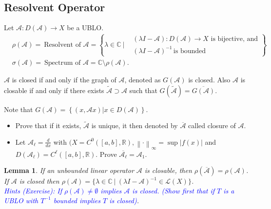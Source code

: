 \documentclass[12pt, oneside]{book}
\newtheorem{lemma}{Lemma}[section]
\newcommand{\norm}[1]{\left\lVert#1\right\rVert}
\begin{document}
\subsection{Resolvent Operator}		
\begin{definition}
	Let $\mathscr{A}:D(\mathscr{A})\longrightarrow X$ be a UBLO.
	\begin{align*}
		&\rho(\mathscr{A})=\ \text{Resolvent of $\mathscr{A}$} = \left\{\lambda\in \mathbb{C}\ \bigg| \begin{aligned}
			&(\lambda I - \mathscr{A}) : D(\mathscr{A}) \to X \text{ is bijective, and} \\
			&(\lambda I - \mathscr{A})^{-1} \, \text{is bounded}
		\end{aligned}\right\}\\
		&\sigma(\mathscr{A})= \ \text{Spectrum of $\mathscr{A}$}= \mathbb{C}\setminus\rho(\mathscr{A}).
	\end{align*}
\end{definition}		
	\begin{definition}
		$\mathscr{A}$ is closed if and only if the graph of $\mathscr{A}$, denoted as $G(\mathscr{A})$ is closed. Also $\mathscr{A}$ is closable if and only if there exists $\tilde{\mathscr{A}}\supset\mathscr{A}$ such that $G(\tilde{\mathscr{A}})=\overline{G(\mathscr{A})}$.
	\end{definition}	
	\vspace{-2mm}
Note that $G(\mathscr{A})=\left\{(x,\mathscr{A}x)\big|x\in D(\mathscr{A})\right\}$.		
\begin{exercise}{}{}
	\begin{itemize}
		\item [1.] Prove that if it exists, $\tilde{\mathscr{A}}$ is unique, it then denoted by $\overline{\mathscr{A}}$ called closure of $\mathscr{A}$.
		\item [2.] Let $\mathscr{A}_{\ell}=\frac{d}{dx}$ with $(X=C^0([a,b],\mathbb{R}),\norm{\cdot}_{\infty}=\sup|f(x)|$ and $D(\mathscr{A}_{\ell})=C^{\ell}([a,b],\mathbb{R})$. Prove $\overline{\mathscr{A}_{\ell}}=\mathscr{A}_1$.
	\end{itemize}
\end{exercise}		
\begin{lemma}
	If an unbounded linear operator $\mathscr{A}$ is closable, then $\rho(\overline{\mathscr{A}})=\rho(\mathscr{A})$. If $\mathscr{A}$ is closed then $\rho(\mathscr{A})=\{\lambda\in \mathbb{C}\ | \ (\lambda I-\mathscr{A})^{-1}\in \mathcal{L}(X)\}$.\\
	\textcolor{blue}{Hints (Exercise): If $\rho(\mathscr{A})\neq \emptyset$ implies $\mathscr{A}$ is closed. (Show first that if $T$ is a UBLO with $T^{-1}$ bounded implies $T$ is closed)}.
\end{lemma}		
		
\end{document}
